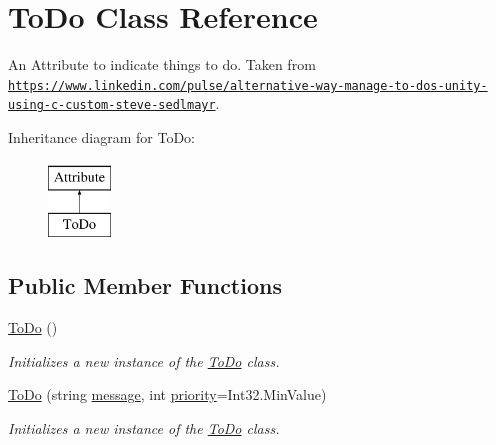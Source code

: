 \hypertarget{class_to_do}{\section{To\-Do Class Reference}
\label{class_to_do}
}


An Attribute to indicate things to do. Taken from \href{https://www.linkedin.com/pulse/alternative-way-manage-to-dos-unity-using-c-custom-steve-sedlmayr}{\tt https\-://www.\-linkedin.\-com/pulse/alternative-\/way-\/manage-\/to-\/dos-\/unity-\/using-\/c-\/custom-\/steve-\/sedlmayr}.  


Inheritance diagram for To\-Do\-:\begin{figure}[H]
\begin{center}
\leavevmode
\includegraphics[height=2.000000cm]{class_to_do}
\end{center}
\end{figure}
\subsection*{Public Member Functions}
\begin{DoxyCompactItemize}
\item 
\hyperlink{class_to_do_a13f85f07515c82da18d3a9dd49d28042}{To\-Do} ()
\begin{DoxyCompactList}\small\item\em Initializes a new instance of the \hyperlink{class_to_do}{To\-Do} class. \end{DoxyCompactList}\item 
\hyperlink{class_to_do_ad8f135e6dde90f2cfe83ba29c24323ae}{To\-Do} (string \hyperlink{class_to_do_a336e134b1d082bc32723268bff2920d0}{message}, int \hyperlink{class_to_do_acb159b74fbad5a561f6c79c3cd892fe6}{priority}=Int32.\-Min\-Value)
\begin{DoxyCompactList}\small\item\em Initializes a new instance of the \hyperlink{class_to_do}{To\-Do} class. \end{DoxyCompactList}\end{DoxyCompactItemize}
